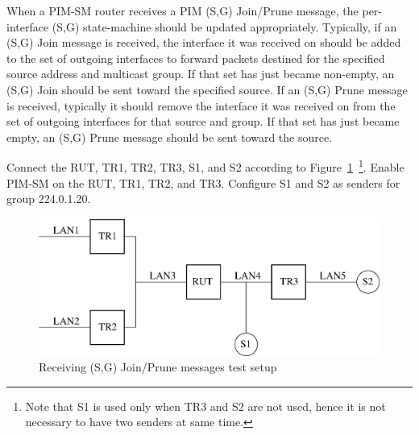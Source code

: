 \documentclass[11pt]{report}
\begin{document}
When a PIM-SM router receives a PIM (S,G) Join/Prune message, the
per-interface (S,G) state-machine should be updated appropriately.
Typically, if an (S,G) Join message is received, the interface it was
received on should be added to the set of outgoing interfaces to
forward packets destined for the specified source address and multicast group.
If that set has just became non-empty, an (S,G) Join should be sent
toward the specified source.
If an (S,G) Prune message is received, typically it should remove
the interface it was received on from the set of outgoing interfaces
for that source and group. If
that set has just became empty, an (S,G) Prune message should be
sent toward the source.

Connect the RUT, TR1, TR2, TR3, S1, and S2 according to
Figure~\ref{fig:receiving_sg_join_prune_messages}~\footnote{Note that S1 is
used only when TR3 and S2 are not used, hence it is not necessary to have two
senders at same time.}.
Enable PIM-SM on the RUT, TR1, TR2, and TR3.
Configure S1 and S2 as senders for group 224.0.1.20.

\begin{figure}[htbp]
  \begin{center}
    \includegraphics[scale=0.8]{figs/pim_test_4_3_receiving_sg_join_prune_messages}
    \caption{Receiving (S,G) Join/Prune messages test setup}
    \label{fig:receiving_sg_join_prune_messages}
  \end{center}
\end{figure}


\end{document}
